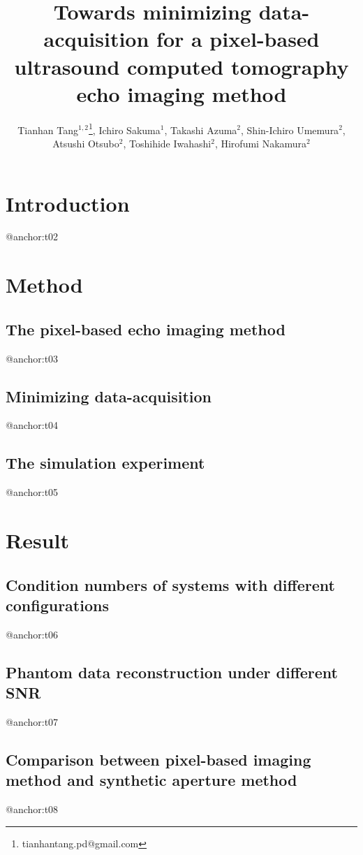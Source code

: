 \documentclass[]{acoust}
\title{Towards minimizing data-acquisition for a pixel-based ultrasound computed tomography echo imaging method}
\author{Tianhan Tang$^{1,2}$\thanks{tianhantang.pd@gmail.com}, Ichiro Sakuma$^{1}$, Takashi Azuma$^{2}$, Shin-Ichiro Umemura$^{2}$,\\
Atsushi Otsubo$^{2}$, Toshihide Iwahashi$^{2}$, Hirofumi Nakamura$^{2}$}
\begin{document}
\maketitle

\section{Introduction}
\label{sec:introduction}

@anchor:t02

\section{Method}
\label{sec:method}

\subsection{The pixel-based echo imaging method}
@anchor:t03

\subsection{Minimizing data-acquisition}
@anchor:t04

\subsection{The simulation experiment}
@anchor:t05

\section{Result}
\label{sec:result}

\subsection{Condition numbers of systems with different configurations}
@anchor:t06

\subsection{Phantom data reconstruction under different SNR}
@anchor:t07

\subsection{Comparison between pixel-based imaging method and synthetic aperture method}
@anchor:t08
\end{document}
